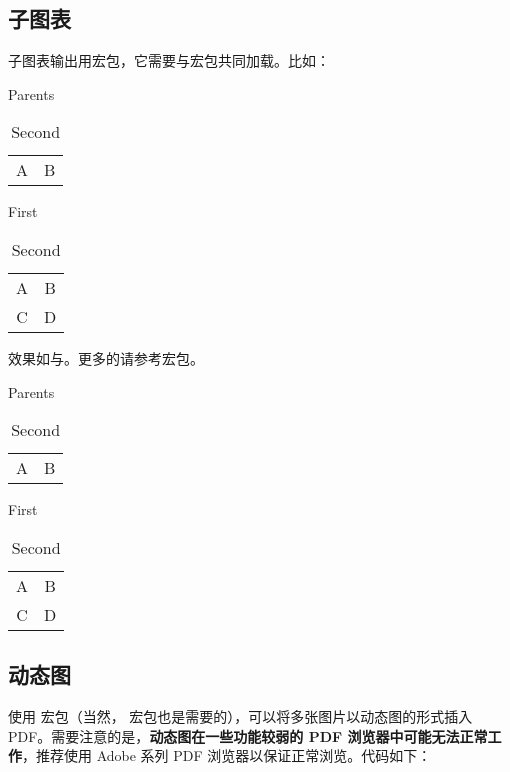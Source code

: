 \subsection{子图表}
子图表输出用宏包，它需要与宏包共同加载。比如：
\begin{latex}
\usepackage{caption,subcaption}
  \captionsetup[sub]{labelformat=simple}
  \renewcommand{\thesubtable}{(\alph{subtable})}
\begin{table}
\caption{Parents}
\begin{subtable}[b]{0.5\linewidth}
  \centering
  \begin{tabular}{|c|c|}
  A & B \\ \end{tabular}
  \caption{First}\label{...}
\end{subtable}  
\begin{subtable}[b]{0.5\linewidth}
  \centering
  \begin{tabular}{|c|c|}
  A & B \\ C & D \end{tabular}
  \caption{Second}
\end{subtable}  
\end{table}
\end{latex}

效果如与。更多的请参考宏包。
\begin{table}[!htb]
\caption{Parents}
\begin{subtable}[b]{0.5\linewidth}
  \centering
  \begin{tabular}{|c|c|}
  A & B \\ \end{tabular}
  \caption{First}\label{subtab:subcaption1}
\end{subtable}  
\begin{subtable}[b]{0.5\linewidth}
  \centering
  \begin{tabular}{|c|c|}
  A & B \\ C & D \end{tabular}
  \caption{Second}\label{subtab:subcaption2}
\end{subtable}  
\end{table}

\subsection{动态图}
使用  宏包（当然， 宏包也是需要的），可以将多张图片以动态图的形式插入 PDF。需要注意的是，\textbf{动态图在一些功能较弱的 PDF 浏览器中可能无法正常工作}，推荐使用 Adobe 系列 PDF 浏览器以保证正常浏览。代码如下：
\begin{latex}
\begin{figure}[!hbt]
  \centering
\end{figure}
\end{latex}

